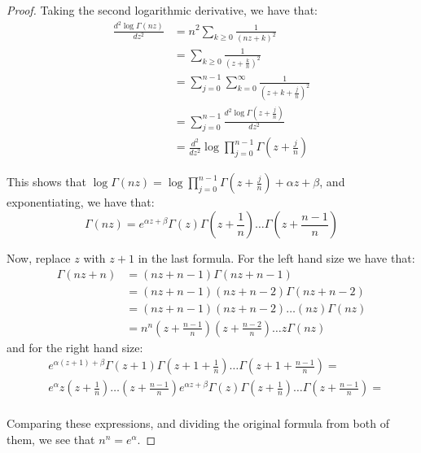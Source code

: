 \documentclass[11pt]{article} %
\theoremstyle{definition}
\theoremstyle{remark}
\begin{document}
\begin{proof}
Taking the second logarithmic derivative, we have that:
\[
\begin{split}    
\frac{d^2\log\Gamma\left(nz\right)}{dz^2} & = n^2 \sum _{k \geq 0}\frac{1}{\left(nz+k\right)^2}\\
& = \sum _{k \geq 0}\frac{1}{\left(z+\frac{k}{n}\right)^2} \\
& = \sum_{j=0}^{n-1} \sum_{k=0}^\infty \frac{1}{\left(z + k + \frac{j}{n}\right)^2} \\
& = \sum_{j=0}^{n-1} \frac{d^2 \log \Gamma\left(z + \frac{j}{n}\right)}{dz^2} \\
& = \frac{d^2}{dz^2} \log \prod_{j=0}^{n-1}\Gamma\left(z + \frac{j}{n}\right)
\end{split}
\]

This shows that $\log\Gamma\left(nz\right) = \log \prod_{j=0}^{n-1}\Gamma\left(z + \frac{j}{n}\right) + \alpha z + \beta$, and exponentiating, we have that:
\[ \Gamma\left(nz\right) = e^{\alpha z + \beta}\Gamma\left(z\right)\Gamma\left(z+\frac{1}{n}\right)\dots\Gamma\left(z+\frac{n-1}{n}\right) \]

Now, replace $z$ with $z+1$ in the last formula. For the left hand size we have that:
\[
\begin{split}
\Gamma\left(nz + n\right) & = \left(nz + n - 1\right) \Gamma\left(nz + n -1\right) \\
& = \left(nz + n - 1\right)\left(nz + n - 2\right)\Gamma\left(nz + n - 2\right) \\
& = \left(nz + n - 1\right)\left(nz + n - 2\right)\dots\left(nz\right)\Gamma\left(nz\right) \\
& = n^n\left(z + \frac{n-1}{n}\right)\left(z + \frac{n-2}{n}\right)\dots z \Gamma\left(nz\right)
\end{split}
\]
and for the right hand size:
\[
\begin{split}
& e^{\alpha \left(z + 1\right) + \beta}\Gamma\left(z+1\right)\Gamma\left(z+1+\frac{1}{n}\right)\dots\Gamma\left(z+1+\frac{n-1}{n}\right) = \\
& e^\alpha z\left(z + \frac{1}{n}\right)\dots\left(z + \frac{n-1}{n}\right)e^{\alpha z + \beta} \Gamma\left(z\right)\Gamma\left(z+\frac{1}{n}\right)\dots\Gamma\left(z+\frac{n-1}{n}\right) = \\
\end{split}
\]

Comparing these expressions, and dividing the original formula from both of them, we see that $n^n = e^\alpha$.


\end{proof}
\end{document}
